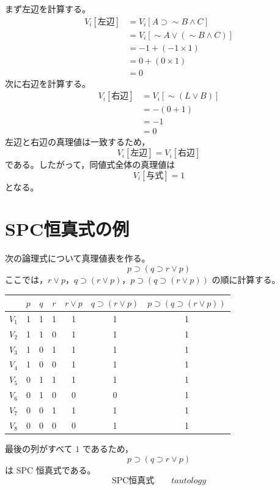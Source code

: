 \documentclass[../main.tex]{subfiles}
\begin{document}
まず左辺を計算する。
\[
  \begin{aligned}
  V_i[\text{左辺}]
  &=
  V_i[A \supset \sim B \land C] \\
  &=
  V_i[\sim A \lor (\sim B \land C)] \\
  &=
  -1 + (-1 \times 1) \\
  &=
  0 + (0 \times 1) \\
  &=
  0
  \end{aligned}
\]
次に右辺を計算する。
\[
  \begin{aligned}
  V_i[\text{右辺}]
  &=
  V_i[\sim(L \lor B)] \\
  &=
  -(0+1) \\
  &=
  -1 \\
  &=
  0
  \end{aligned}
\]
左辺と右辺の真理値は一致するため，
\[
  V_i[\text{左辺}]
  =
  V_i[\text{右辺}]
\]
である。したがって，同値式全体の真理値は
\[
  V_i[\text{与式}] = 1
\]
となる。

\section{SPC恒真式の例}

次の論理式について真理値表を作る。
\[
  p \supset (q \supset r \lor p)
\]
ここでは，\(r \lor p\)，\(q \supset (r \lor p)\)，\(p \supset (q \supset (r \lor p))\) の順に計算する。

\begin{center}
\small
\begin{tabular}{c|ccc|ccc}
\toprule
 & \(p\) & \(q\) & \(r\) & \(r \lor p\) & \(q \supset (r \lor p)\) & \(p \supset (q \supset (r \lor p))\) \\
\midrule
\(V_1\) & 1 & 1 & 1 & 1 & 1 & 1 \\
\(V_2\) & 1 & 1 & 0 & 1 & 1 & 1 \\
\(V_3\) & 1 & 0 & 1 & 1 & 1 & 1 \\
\(V_4\) & 1 & 0 & 0 & 1 & 1 & 1 \\
\(V_5\) & 0 & 1 & 1 & 1 & 1 & 1 \\
\(V_6\) & 0 & 1 & 0 & 0 & 0 & 1 \\
\(V_7\) & 0 & 0 & 1 & 1 & 1 & 1 \\
\(V_8\) & 0 & 0 & 0 & 0 & 1 & 1 \\
\bottomrule
\end{tabular}
\end{center}

最後の列がすべて \(1\) であるため，
\[
  p \supset (q \supset r \lor p)
\]
は SPC 恒真式である。
\[
  \text{SPC恒真式}
  \qquad
  \textit{tautology}
\]
\end{document}
